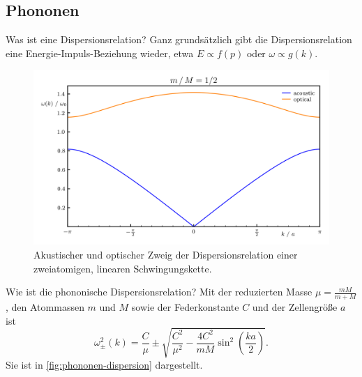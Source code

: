 \subsection{Phononen}


\begin{fquestion}{Was ist eine Dispersionsrelation?}
    Ganz grundsätzlich gibt die Dispersionsrelation eine Energie-Impuls-Beziehung wieder, etwa $E \propto f(p)$ oder $\omega \propto g(k)$.
\end{fquestion}

\begin{figure}[htb]
    \centering
    \includegraphics{img/phonon_branch2.png}
    \caption{Akustischer und optischer Zweig der Dispersionsrelation einer zweiatomigen, linearen Schwingungskette.} %
    \label{fig:phononen-dispersion}
\end{figure}

\begin{fquestion}{Wie ist die phononische Dispersionsrelation?}
    Mit der reduzierten Masse \( \mu = \frac{m M}{m + M} \), den Atommassen $m$ und $M$ sowie der Federkonstante $C$ und der Zellengröße $a$ ist
    \[\omega_\pm^2(k) = \frac{C}{\mu} \pm \sqrt{\frac{C^2}{\mu^2} - \frac{4 C^2}{m M} \sin^2 \left(\frac{k a}{2}\right)}. \]
    Sie ist in \autoref{fig:phononen-dispersion} dargestellt.
\end{fquestion}


